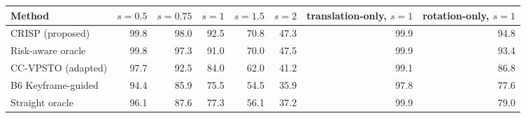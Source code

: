 \begin{tabular}{lrrrrrrr}
\toprule
Method & $s=0.5$ & $s=0.75$ & $s=1$ & $s=1.5$ & $s=2$ & translation-only, $s=1$ & rotation-only, $s=1$ \\
\midrule
CRISP (proposed) & 99.8 & 98.0 & 92.5 & 70.8 & 47.3 & 99.9 & 94.8 \\
Risk-aware oracle & 99.8 & 97.3 & 91.0 & 70.0 & 47.5 & 99.9 & 93.4 \\
CC-VPSTO (adapted) & 97.7 & 92.5 & 84.0 & 62.0 & 41.2 & 99.1 & 86.8 \\
B6 Keyframe-guided & 94.4 & 85.9 & 75.5 & 54.5 & 35.9 & 97.8 & 77.6 \\
Straight oracle & 96.1 & 87.6 & 77.3 & 56.1 & 37.2 & 99.9 & 79.0 \\
\bottomrule
\end{tabular}
